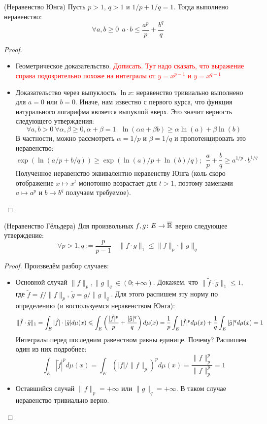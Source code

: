 \begin{proposition} (Неравенство Юнга)
	Пусть $p > 1$, $q > 1$ и $1 / p + 1 / q = 1$. Тогда выполнено неравенство:
	\[
		\forall a, b \ge 0\ \ a \cdot b \le \frac{a^p}{p} + \frac{b^q}{q}
	\]
\end{proposition}

\begin{proof}~
	\begin{itemize}
		\item Геометрическое доказательство. \textcolor{red}{Дописать. Тут надо сказать, что выражение справа подозрительно похоже на интегралы от $y = x^{p - 1}$ и $y = x^{q - 1}$}
		
		\item Доказательство через выпуклость $\ln x$: неравенство тривиально выполнено для $a = 0$ или $b = 0$. Иначе, нам известно с первого курса, что функция натурального логарифма является выпуклой вверх. Это значит верность следующего утверждения:
		\[
			\forall a, b > 0\ \forall \alpha, \beta \ge 0, \alpha + \beta = 1\ \ \ \ln(\alpha a + \beta b) \ge \alpha\ln(a) + \beta\ln(b)
		\]
		В частности, можно рассмотреть $\alpha = 1 / p$ и $\beta = 1 / q$ и пропотенцировать это неравенство:
		\[
			\exp(\ln(a / p + b / q)) \ge \exp(\ln(a) / p + \ln(b) / q);\ \ \frac{a}{p} + \frac{b}{q} \ge a^{1/p} \cdot b^{1/q}
		\]
		Полученное неравенство эквивалентно неравенству Юнга (коль скоро отображение $x \mapsto x^t$ монотонно возрастает для $t > 1$, поэтому заменами $a \mapsto a^p$ и $b \mapsto b^q$ получаем требуемое).
	\end{itemize}
\end{proof}

\begin{theorem} (Неравенство Гёльдера)
	Для произвольных $f, g \colon E \to \overline{\mathbb{R}}$ верно следующее утверждение:
	\[
		\forall p > 1, q := \frac{p}{p - 1} \quad \|f \cdot g\|_1 \le \|f\|_p \cdot \|g\|_q
	\]
\end{theorem}

\begin{proof}
	Произведём разбор случаев:
	\begin{itemize}
		\item Основной случай $\|f\|_p, \|g\|_q \in (0; +\infty)$. Докажем, что $\|\tilde{f} \cdot \tilde{g}\|_1 \le 1$, где $\tilde{f} = f / \|f\|_p$, $\tilde{g} = g / \|g\|_q$. Для этого распишем эту норму по определению (и воспользуемся неравенством Юнга):
		\[
			\|\tilde{f} \cdot \tilde{g}\|_1 = \int_E |\tilde{f}| \cdot |\tilde{g}|d\mu(x) \leqslant \int_E \left(\frac{|\tilde{f}|^p}{p} + \frac{|\tilde{g}|^q}{q}\right)d\mu(x) = \frac{1}{p} \int_E |\tilde{f}|^pd\mu(x) + \frac{1}{q} \int_E |\tilde{g}|^qd\mu(x) = 1
		\]
		Интегралы перед последним равенством равны единице. Почему? Распишем один из них подробнее:
		\[
			\int_E |\tilde{f}|^pd\mu(x) = \int_E (|f| / \|f\|_p)^pd\mu(x) = \frac{\|f\|_p^p}{\|f\|_p^p} = 1
		\]
		
		\item Оставшийся случай $\|f\|_p = +\infty$ или $\|g\|_q = +\infty$. В таком случае неравенство тривиально верно.
	\end{itemize}
\end{proof}

